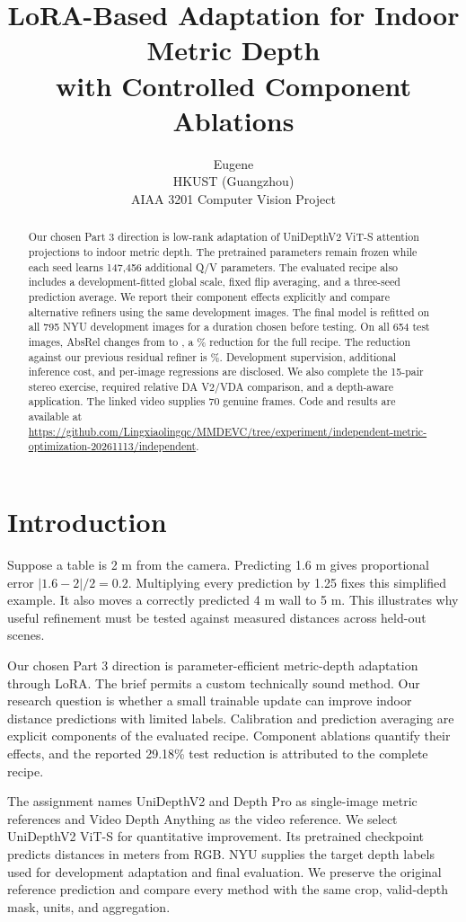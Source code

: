 \documentclass[10pt,twocolumn,letterpaper]{article}
\title{LoRA-Based Adaptation for Indoor Metric Depth\\with Controlled Component Ablations}
\author{Eugene\\HKUST (Guangzhou)\\AIAA 3201 Computer Vision Project}
\begin{document}
\maketitle
\begin{abstract}
Our chosen Part 3 direction is low-rank adaptation of UniDepthV2 ViT-S attention projections to indoor metric depth. The pretrained parameters remain frozen while each seed learns 147,456 additional Q/V parameters. The evaluated recipe also includes a development-fitted global scale, fixed flip averaging, and a three-seed prediction average. We report their component effects explicitly and compare alternative refiners using the same development images. The final model is refitted on all 795 NYU development images for a duration chosen before testing. On all 654 test images, AbsRel changes from \ResearchBaseAbs{} to \ResearchFinalAbs{}, a \ResearchGain\% reduction for the full recipe. The reduction against our previous residual refiner is \ResearchPreviousGain\%. Development supervision, additional inference cost, and per-image regressions are disclosed. We also complete the 15-pair stereo exercise, required relative DA V2/VDA comparison, and a depth-aware application. The linked video supplies 70 genuine frames. Code and results are available at \url{https://github.com/Lingxiaolingqc/MMDEVC/tree/experiment/independent-metric-optimization-20261113/independent}.
\end{abstract}

\section{Introduction}
Suppose a table is 2 m from the camera. Predicting 1.6 m gives proportional error $|1.6-2|/2=0.2$. Multiplying every prediction by 1.25 fixes this simplified example. It also moves a correctly predicted 4 m wall to 5 m. This illustrates why useful refinement must be tested against measured distances across held-out scenes.

Our chosen Part 3 direction is parameter-efficient metric-depth adaptation through LoRA. The brief permits a custom technically sound method. Our research question is whether a small trainable update can improve indoor distance predictions with limited labels. Calibration and prediction averaging are explicit components of the evaluated recipe. Component ablations quantify their effects, and the reported 29.18\% test reduction is attributed to the complete recipe.

The assignment names UniDepthV2 and Depth Pro as single-image metric references and Video Depth Anything as the video reference. We select UniDepthV2 ViT-S for quantitative improvement. Its pretrained checkpoint predicts distances in meters from RGB. NYU supplies the target depth labels used for development adaptation and final evaluation. We preserve the original reference prediction and compare every method with the same crop, valid-depth mask, units, and aggregation.
\end{document}
